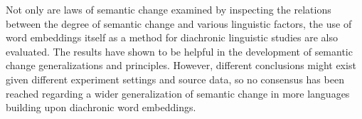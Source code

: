 Not only are laws of semantic change examined by inspecting the relations between the degree of semantic change and various linguistic factors, the use of word embeddings itself as a method for diachronic linguistic studies are also evaluated. The results have shown to be helpful in the development of semantic change generalizations and principles. However, different conclusions might exist given different experiment settings and source data, so no consensus has been reached regarding a wider generalization of semantic change in more languages building upon diachronic word embeddings.



